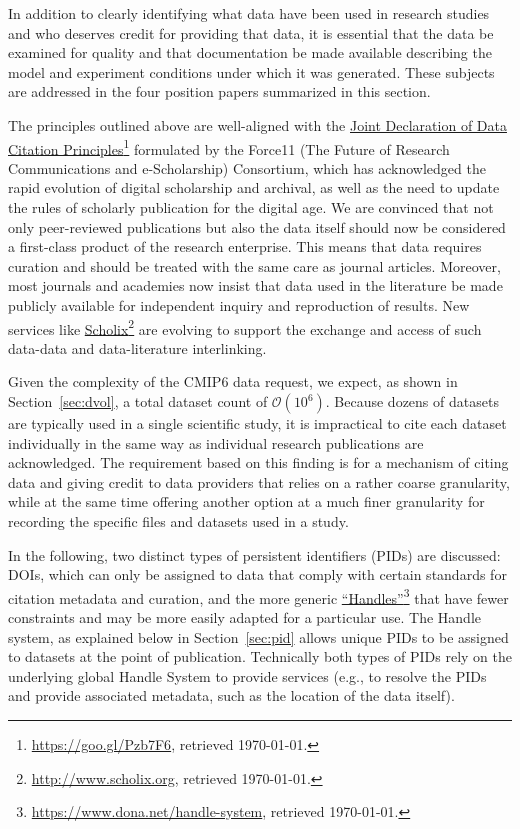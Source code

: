 \documentclass[gmd,manuscript]{copernicus}
\newcommand{\pllabel}[1]{\label{p-#1}\linelabel{l-#1}}
\newcommand{\urlref}[2] {\href{#1}{#2}\footnote{\url{#1}, retrieved \today.}}
\begin{document}
In addition to clearly identifying what data have been used in
research studies and who deserves credit for providing that data, it
is essential that the data be examined for quality and that
documentation be made available describing the model and experiment
conditions under which it was generated. These subjects are addressed
in the four position papers summarized in this section.

The principles outlined above are well-aligned with the
\urlref{https://goo.gl/Pzb7F6}{Joint Declaration of Data Citation
Principles} formulated by the Force11 (The Future of Research
Communications and e-Scholarship) Consortium, which has acknowledged
the rapid evolution of digital scholarship and archival, as well as
the need to update the rules of scholarly publication for the digital
age. We are convinced that not only peer-reviewed publications but
also the data itself should now be considered a first-class product of
the research enterprise. This means that data requires curation and
should be treated with the same care as journal articles. Moreover,
most journals and academies now insist that data used in the
literature be made publicly available for independent inquiry and
reproduction of results. New services like
\urlref{http://www.scholix.org}{Scholix} are evolving to support the
exchange and access of such data-data and data-literature
interlinking.

Given the complexity of the CMIP6 data request, we expect, as shown in
Section~\ref{sec:dvol}, a total dataset count of $\mathcal{O}(10^6)$.
Because dozens of datasets are typically used in a single scientific
study, it is impractical to cite each dataset individually in the same
way as individual research publications are acknowledged. The
requirement based on this finding is for a mechanism of citing data
and giving credit to data providers that relies on a rather coarse
granularity, while at the same time offering another option at a much
finer granularity for recording the specific files and datasets used
in a study.

In the following, two distinct types of persistent identifiers (PIDs)
are discussed: DOIs, which can only be assigned to data that comply
with certain standards for citation metadata and curation, and the
more generic
\pllabel{RC1-37}
\urlref{https://www.dona.net/handle-system}{``Handles''} that have
fewer constraints and may be more easily adapted for a particular use.
\pllabel{RC2-31}
The Handle system, as explained below in Section~\ref{sec:pid} allows
unique PIDs to be assigned to datasets at the point of publication.
Technically both types of PIDs rely on the underlying global Handle
System to provide services (e.g., to resolve the PIDs and provide
associated metadata, such as the location of the data itself).
\end{document}
